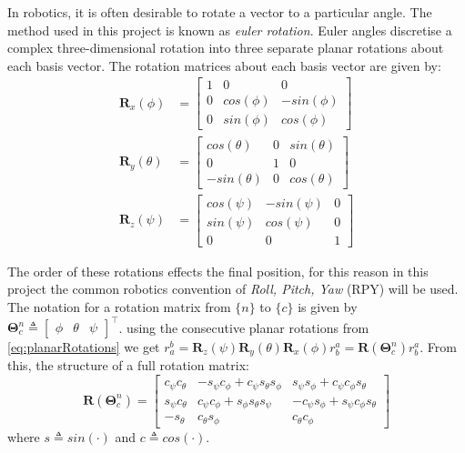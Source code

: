 \documentclass{UoNMCHA}
\numberwithin{equation}{section}
\begin{document}
In robotics, it is often desirable to rotate a vector to a particular angle. The method used in this project is known as \textit{euler rotation}. Euler angles discretise a complex three-dimensional rotation into three separate planar rotations about each basis vector. The rotation matrices about each basis vector are given by:
\begin{equation}\label{eq:planarRotations}
	\begin{split}
		\mathbf{R}_{x}(\phi) &= 
		\begin{bmatrix}
			1 & 0 & 0\\
			0 & cos(\phi) & -sin(\phi) \\
			0 & sin(\phi) & cos(\phi)
		\end{bmatrix}\\
		\mathbf{R}_{y}(\theta) &= 
		\begin{bmatrix}
			cos(\theta) & 0 & sin(\theta)\\
			0 & 1 & 0 \\
			-sin(\theta) & 0 & cos(\theta)
		\end{bmatrix}\\
		\mathbf{R}_{z}(\psi) &= 
		\begin{bmatrix}
			cos(\psi) & -sin(\psi) & 0\\
			sin(\psi) & cos(\psi) & 0 \\
			0 & 0 & 1
		\end{bmatrix}
	\end{split}
\end{equation}

The order of these rotations effects the final position, for this reason in this project the common robotics convention of \textit{Roll, Pitch, Yaw} (RPY) will be used. The notation for a rotation matrix from $\{n\}$ to $\{c\}$ is given by $\mathbf{\Theta}^{n}_{c}  \triangleq \begin{bmatrix}\phi & \theta & \psi\end{bmatrix}^\top$. using the consecutive planar rotations from \cref{eq:planarRotations} we get $r^{b}_{a} = \mathbf{R}_{z}(\psi)\mathbf{R}_{y}(\theta)\mathbf{R}_{x}(\phi)r^{a}_{b} = \mathbf{R}(\mathbf{\Theta}^{n}_{c})r^{a}_{b}$. From this, the structure of a full rotation matrix:
\begin{equation}
	\mathbf{R}(\mathbf{\Theta}^{n}_{c}) = 
	\begin{bmatrix}
		c_{\psi} c_{\theta} & −s_{\psi} c_{\phi} + c_{\psi} s_{\theta} s_{\phi} & s_{\psi} s_{\phi} + c_{\psi} c_{\phi} s_{\theta}\\
		s_{\psi} c_{\theta} & c_{\psi} c_{\phi} + s_{\phi} s_{\theta} s_{\psi} &  −c_{\psi} s_{\phi} + s_{\psi} c_{\phi} s_{\theta}\\
		−s_{\theta} & c_{\theta} s_{\phi} & c_{\theta} c_{\phi}		
	\end{bmatrix}
\end{equation}
where $s  \triangleq sin(\mathbf{\cdot})$ and $c  \triangleq cos(\mathbf{\cdot})$.
\end{document}
